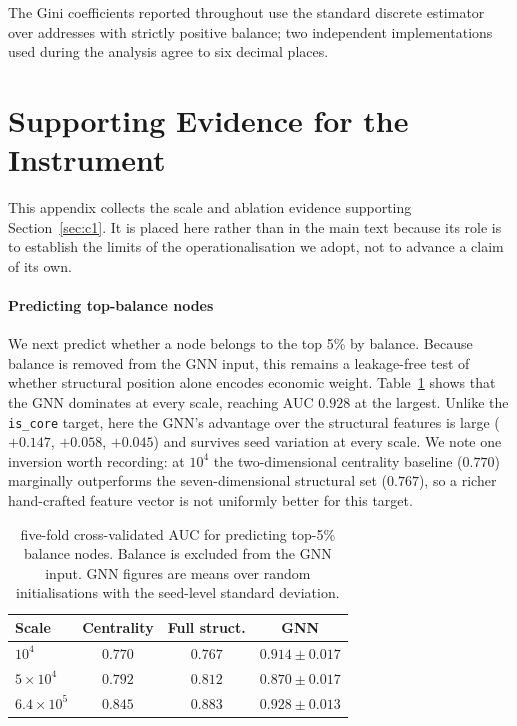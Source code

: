 \documentclass[final,5p,times]{elsarticle}
\begin{document}
The Gini coefficients reported throughout use the standard discrete
estimator over addresses with strictly positive balance; two independent
implementations used during the analysis agree to six decimal places.

\FloatBarrier
\section{Supporting Evidence for the Instrument}
\label{app:instrument}

This appendix collects the scale and ablation evidence supporting
Section~\ref{sec:c1}. It is placed here rather than in the main text because
its role is to establish the limits of the operationalisation we adopt, not
to advance a claim of its own.

\paragraph{Predicting top-balance nodes}
We next predict whether a node belongs to the top 5\% by balance. Because
balance is removed from the GNN input, this remains a leakage-free test of
whether structural position alone encodes economic weight.
Table~\ref{tab:c1_balance} shows that the GNN dominates at every scale,
reaching AUC $0.928$ at the largest. Unlike the \texttt{is\_core} target,
here the GNN's advantage over the structural features is large
($+0.147$, $+0.058$, $+0.045$) and survives seed variation at every scale.
We note one inversion worth recording: at $10^4$ the two-dimensional
centrality baseline ($0.770$) marginally outperforms the seven-dimensional
structural set ($0.767$), so a richer hand-crafted feature vector is not
uniformly better for this target.

\begin{table}[H]
\centering\small
\caption{five-fold cross-validated AUC for predicting
top-5\% balance nodes. Balance is excluded from the GNN input. GNN figures
are means over random initialisations with the seed-level standard
deviation.}
\label{tab:c1_balance}
\begin{tabular}{lccc}
\toprule
Scale & Centrality & Full struct. & \textbf{GNN} \\
\midrule
$10^4$          & $0.770$ & $0.767$ & $\mathbf{0.914 \pm 0.017}$ \\
$5\times10^4$   & $0.792$ & $0.812$ & $\mathbf{0.870 \pm 0.017}$ \\
$6.4\times10^5$ & $0.845$ & $0.883$ & $\mathbf{0.928 \pm 0.013}$ \\
\bottomrule
\end{tabular}
\end{table}
\end{document}
